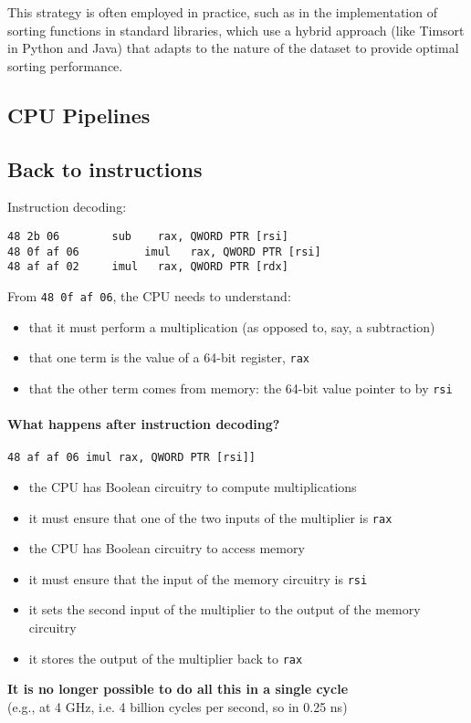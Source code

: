 \documentclass[12pt]{article}
\begin{document}
This strategy is often employed in practice, such as in the implementation of sorting functions in standard libraries, which use a hybrid approach (like Timsort in Python and Java) that adapts to the nature of the dataset to provide optimal sorting performance.

\subsection{CPU Pipelines}
\subsection{Back to instructions}

Instruction decoding:

\begin{lstlisting}
48 2b 06        sub    rax, QWORD PTR [rsi]
48 0f af 06          imul   rax, QWORD PTR [rsi]
48 af af 02     imul   rax, QWORD PTR [rdx]
\end{lstlisting}

From \texttt{48 0f af 06}, the CPU needs to understand:

\begin{itemize}
  \item that it must perform a multiplication (as opposed to, say, a subtraction)
  \item that one term is the value of a 64-bit register, \texttt{rax}
  \item that the other term comes from memory: the 64-bit value pointer to by \texttt{rsi}
\end{itemize}


\paragraph{What happens after instruction decoding?}
\texttt{48 af af 06     imul   rax, QWORD PTR [rsi]]}
\begin{itemize}
    \item the CPU has Boolean circuitry to compute multiplications
    \item it must ensure that one of the two inputs of the multiplier is \texttt{rax}
    \item the CPU has Boolean circuitry to access memory
    \item it must ensure that the input of the memory circuitry is \texttt{rsi}
    \item it sets the second input of the multiplier to the output of the memory circuitry
    \item it stores the output of the multiplier back to \texttt{rax}
\end{itemize}
\textbf{It is no longer possible to do all this in a single cycle} \\
(e.g., at 4 GHz, i.e. 4 billion cycles per second, so in 0.25 ns)
\end{document}
